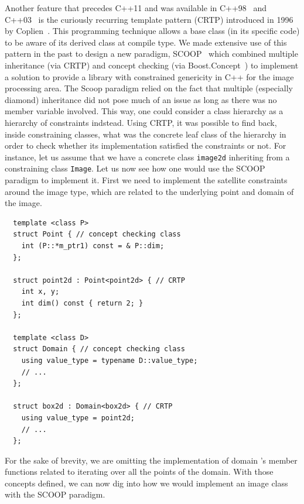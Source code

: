 Another feature that precedes C++11 and was available in C++98~\parencite{iso.1998.cpp} and
C++03~\parencite{iso.2003.cpp} is the curiously recurring template pattern (CRTP) introduced in 1996 by
Coplien~\parencite{coplien.1996.crtp}. This programming technique allows a base class (in its specific code) to be aware
of its derived class at compile type. We made extensive use of this pattern in the past to design a new paradigm,
SCOOP~\parencite{burrus.2003.mpool,geraud.2006.scoop-pres,geraud.2008.mpool,levillain.2011.phd} which combined multiple
inheritance (via CRTP) and concept checking (via Boost.Concept~\parencite{siek.2000.concept,boost.2006.concepts}) to
implement a solution to provide a library with constrained genericity in C++ for the image processing area. The Scoop
paradigm relied on the fact that multiple (especially diamond) inheritance did not pose much of an issue as long as
there was no member variable involved. This way, one could consider a class hierarchy as a hierarchy of constraints
indstead. Using CRTP, it was possible to find back, inside constraining classes, what was the concrete leaf class of the
hierarchy in order to check whether its implementation satisfied the constraints or not. For instance, let us assume
that we have a concrete class \texttt{image2d} inheriting from a constraining class \texttt{Image}. Let us now see how
one would use the SCOOP paradigm to implement it. First we need to implement the satellite constraints around the image
type, which are related to the underlying point and domain of the image.

\begin{verbatim}
  template <class P>
  struct Point { // concept checking class
    int (P::*m_ptr1) const = & P::dim;
  };

  struct point2d : Point<point2d> { // CRTP
    int x, y;
    int dim() const { return 2; }
  };

  template <class D>
  struct Domain { // concept checking class
    using value_type = typename D::value_type;
    // ...
  };

  struct box2d : Domain<box2d> { // CRTP
    using value_type = point2d;
    // ...
  };
\end{verbatim}

For the sake of brevity, we are omitting the implementation of domain 's member functions related to iterating over all
the points of the domain. With those concepts defined, we can now dig into how we would implement an image class with
the SCOOP paradigm.

